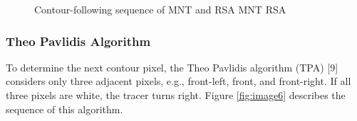 \begin{figure}[htbp]
	\centering
	\caption{Contour-following sequence of MNT and RSA \protect{} MNT \protect{} RSA}
	\label{fig:mnt_rsa}
\end{figure}

\subsubsection{Theo Pavlidis Algorithm}
To determine the next contour pixel, the Theo Pavlidis algorithm (TPA) [9] considers only three adjacent pixels, e.g., front-left, front, and front-right. If all three pixels are white, the tracer turns right. Figure \ref{fig:image6} describes the sequence of this algorithm. 

